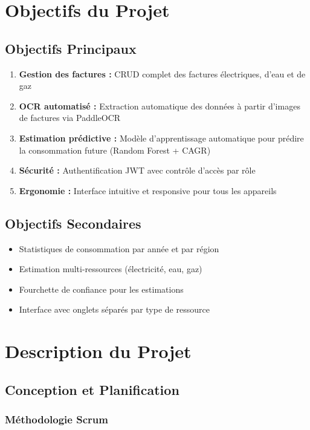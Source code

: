 \documentclass[12pt,a4paper]{article}
\begin{document}
\section{Objectifs du Projet}

\subsection{Objectifs Principaux}
\begin{enumerate}
    \item \textbf{Gestion des factures :} CRUD complet des factures électriques, d'eau et de gaz
    \item \textbf{OCR automatisé :} Extraction automatique des données à partir d'images de factures via PaddleOCR
    \item \textbf{Estimation prédictive :} Modèle d'apprentissage automatique pour prédire la consommation future (Random Forest + CAGR)
    \item \textbf{Sécurité :} Authentification JWT avec contrôle d'accès par rôle
    \item \textbf{Ergonomie :} Interface intuitive et responsive pour tous les appareils
\end{enumerate}

\subsection{Objectifs Secondaires}
\begin{itemize}
    \item Statistiques de consommation par année et par région
    \item Estimation multi-ressources (électricité, eau, gaz)
    \item Fourchette de confiance pour les estimations
    \item Interface avec onglets séparés par type de ressource
\end{itemize}

\section{Description du Projet}

\subsection{Conception et Planification}

\subsubsection{Méthodologie Scrum}
\end{document}
